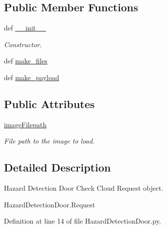 \subsection*{Public Member Functions}
\begin{DoxyCompactItemize}
\item 
def \hyperlink{classRappCloud_1_1CloudMsgs_1_1HazardDetectionDoor_1_1HazardDetectionDoor_1_1Request_a64876664985e455d569cf613bfbb138e}{\-\_\-\-\_\-init\-\_\-\-\_\-}
\begin{DoxyCompactList}\small\item\em Constructor. \end{DoxyCompactList}\item 
def \hyperlink{classRappCloud_1_1CloudMsgs_1_1HazardDetectionDoor_1_1HazardDetectionDoor_1_1Request_a4fd49964952fb14b33de233d8df43b6e}{make\-\_\-files}
\item 
def \hyperlink{classRappCloud_1_1CloudMsgs_1_1HazardDetectionDoor_1_1HazardDetectionDoor_1_1Request_a56712ed49126a04d039bb5843253debc}{make\-\_\-payload}
\end{DoxyCompactItemize}
\subsection*{Public Attributes}
\begin{DoxyCompactItemize}
\item 
\hyperlink{classRappCloud_1_1CloudMsgs_1_1HazardDetectionDoor_1_1HazardDetectionDoor_1_1Request_a9c1c9389a70d7f2996dae83477414ec1}{image\-Filepath}
\begin{DoxyCompactList}\small\item\em File path to the image to load. \end{DoxyCompactList}\end{DoxyCompactItemize}


\subsection{Detailed Description}
\begin{DoxyVerb}Hazard Detection Door Check Cloud Request object.

HazardDetectionDoor.Request
\end{DoxyVerb}
 

Definition at line 14 of file Hazard\-Detection\-Door.\-py.



